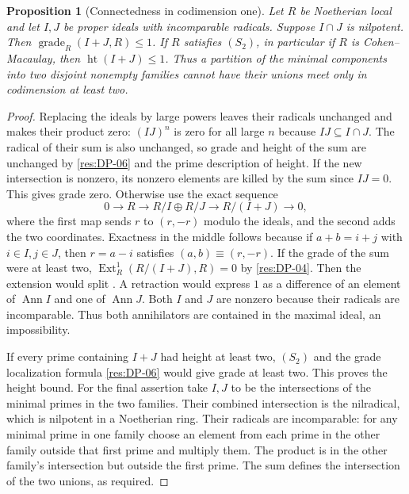 \documentclass[11pt,oneside,openany]{book}
\newtheorem{proposition}[theorem]{Proposition}
\theoremstyle{definition}
\theoremstyle{remark}
\begin{document}
\begin{proposition}[Connectedness in codimension one]\label{res:CM-16}
Let $R$ be Noetherian local and let $I,J$ be proper ideals
with incomparable radicals. Suppose $I\cap J$ is nilpotent.
Then $\operatorname{grade}_R(I+J,R)\le1$. If $R$ satisfies
$(S_2)$, in particular if $R$ is Cohen--Macaulay, then
$\operatorname{ht}(I+J)\le1$. Thus a partition of the
minimal components into two disjoint nonempty families
cannot have their unions meet only in codimension at
least two.
\end{proposition}
\begin{proof}
Replacing the ideals by large powers leaves their radicals
unchanged and makes their product zero: $(IJ)^n$ is zero
for all large $n$ because $IJ\subseteq I\cap J$. The radical
of their sum is also unchanged, so grade and height of the
sum are unchanged by \ref{res:DP-06} and the prime description
of height. If the new intersection is nonzero, its nonzero
elements are killed by the sum since $IJ=0$. This gives
grade zero. Otherwise use the exact sequence
\[
 0\longrightarrow R\longrightarrow R/I\oplus R/J
   \longrightarrow R/(I+J)\longrightarrow0 ,
\]
where the first map sends $r$ to $(r,-r)$ modulo the ideals,
and the second adds the two coordinates. Exactness in the
middle follows because if $a+b=i+j$ with $i\in I,j\in J$,
then $r=a-i$ satisfies $(a,b)\equiv(r,-r)$.
If the grade of the sum were at least two,
$\operatorname{Ext}^1_R(R/(I+J),R)=0$ by \ref{res:DP-04}.
Then the extension would split
\cite[Theorem ALG-10-C03-S02]{p103}.
A retraction would express $1$ as a difference of an element
of $\operatorname{Ann} I$ and one of $\operatorname{Ann} J$.
Both $I$ and $J$ are nonzero because their radicals are
incomparable. Thus both annihilators are contained in the
maximal ideal, an impossibility.

If every prime containing $I+J$ had height at least two,
$(S_2)$ and the grade localization formula \ref{res:DP-06}
would give grade at least two. This proves the height
bound. For the final assertion take $I,J$ to be the
intersections of the minimal primes in the two families.
Their combined intersection is the nilradical, which is
nilpotent in a Noetherian ring. Their radicals are
incomparable: for any minimal prime in one family choose
an element from each prime in the other family outside
that first prime and multiply them. The product is in
the other family's intersection but outside the first prime.
The sum defines the intersection of the two unions,
as required.
\end{proof}
\end{document}
